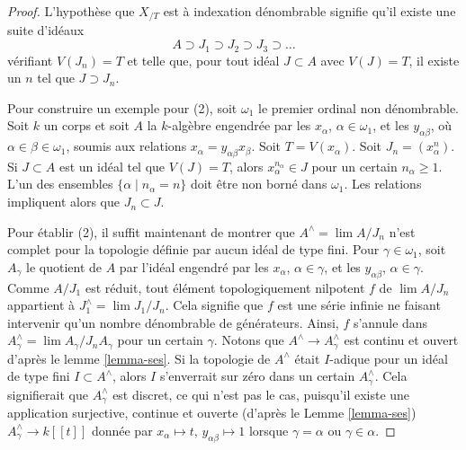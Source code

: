 \begin{proof}
L'hypothèse que $X_{/T}$ est à indexation dénombrable signifie qu'il existe une
suite d'idéaux
$$
A \supset J_1 \supset J_2 \supset J_3 \supset \ldots
$$
vérifiant $V(J_n) = T$ et telle que, pour tout idéal $J \subset A$ avec $V(J) = T$,
il existe un $n$ tel que $J \supset J_n$.

\medskip\noindent
Pour construire un exemple pour (2), soit $\omega_1$ le premier ordinal non
dénombrable. Soit $k$ un corps et soit
$A$ la $k$-algèbre engendrée par les $x_\alpha$, $\alpha \in \omega_1$,
et les $y_{\alpha \beta}$, où $\alpha \in \beta \in \omega_1$,
soumis aux relations $x_\alpha = y_{\alpha \beta} x_\beta$.
Soit $T = V(x_\alpha)$. Soit $J_n = (x_\alpha^n)$.
Si $J \subset A$ est un idéal tel que
$V(J) = T$, alors $x_\alpha^{n_\alpha} \in J$ pour un certain $n_\alpha \geq 1$.
L'un des ensembles $\{\alpha \mid n_\alpha = n\}$ doit être non borné dans
$\omega_1$. Les relations impliquent alors que $J_n \subset J$.

\medskip\noindent
Pour établir (2), il suffit maintenant de montrer que $A^\wedge = \lim A/J_n$
n'est complet pour la topologie définie par aucun idéal de type fini.
Pour $\gamma \in \omega_1$, soit $A_\gamma$ le quotient de $A$
par l'idéal engendré par les $x_\alpha$, $\alpha \in \gamma$, et les
$y_{\alpha \beta}$, $\alpha \in \gamma$. Comme $A/J_1$ est réduit,
tout élément topologiquement nilpotent $f$ de $\lim A/J_n$ appartient à
$J_1^\wedge = \lim J_1/J_n$. Cela signifie que $f$ est une série infinie
ne faisant intervenir qu'un nombre dénombrable de générateurs. Ainsi, $f$ s'annule dans
$A_\gamma^\wedge = \lim A_\gamma/J_nA_\gamma$ pour un certain $\gamma$.
Notons que $A^\wedge \to A_\gamma^\wedge$ est continu et ouvert d'après le
lemme \ref{lemma-ses}.
Si la topologie de $A^\wedge$ était $I$-adique pour un idéal de type fini
$I \subset A^\wedge$, alors $I$ s'enverrait sur zéro dans un certain
$A_\gamma^\wedge$. Cela signifierait que $A_\gamma^\wedge$ est discret,
ce qui n'est pas le cas, puisqu'il existe une application surjective, continue et ouverte
(d'après le Lemme \ref{lemma-ses})
$A_\gamma^\wedge \to k[[t]]$ donnée par
$x_\alpha \mapsto t$, $y_{\alpha \beta} \mapsto 1$ lorsque
$\gamma = \alpha$ ou $\gamma \in \alpha$.


\end{proof}
